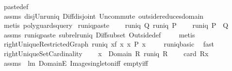 \begin{isabellebody}
\ paste{\isacharunderscore}def\ \isanewline
\ \ \isamarkupfalse%
\ assms\ disj{\isacharunderscore}Un{\isacharunderscore}runiq\ Diff{\isacharunderscore}disjoint\ Un{\isacharunderscore}commute\ outside{\isacharunderscore}reduces{\isacharunderscore}domain\isanewline
\ \ \isamarkupfalse%
\ {\isacharparenleft}metis\ {\isacharparenleft}poly{\isacharunderscore}guards{\isacharunderscore}query{\isacharparenright}{\isacharparenright}%
\endisatagproof
{\isafoldproof}%
%
\isadelimproof
\isanewline
%
\endisadelimproof
\isanewline
{}\isamarkupfalse%
\ runiq{\isacharunderscore}paste{}{\isacharcolon}\ \isanewline
\ \ \ {\isachardoublequoteopen}runiq\ Q{\isachardoublequoteclose}\ {\isachardoublequoteopen}runiq\ P{\isachardoublequoteclose}\ \isanewline
\ \ \ {\isachardoublequoteopen}runiq\ {\isacharparenleft}P\ {\isacharplus}{\isacharasterisk}\ Q{\isacharparenright}{\isachardoublequoteclose}\isanewline
%
\isadelimproof
\ \ %
\endisadelimproof
%
\isatagproof
{}\isamarkupfalse%
\ assms\ runiq{\isacharunderscore}paste{}\ subrel{\isacharunderscore}runiq\ Diff{\isacharunderscore}subset\ Outside{\isacharunderscore}def\ \isanewline
\ \ \isamarkupfalse%
\ {\isacharparenleft}metis{\isacharparenright}%
\endisatagproof
{\isafoldproof}%
%
\isadelimproof
\isanewline
%
\endisadelimproof
\isanewline
\isanewline
{}\isamarkupfalse%
\ rightUniqueRestrictedGraph{\isacharcolon}\ {\isachardoublequoteopen}runiq\ {\isacharbraceleft}{\isacharparenleft}x{\isacharcomma}f\ x{\isacharparenright}{\isacharbar}\ x{\isachardot}\ P\ x{\isacharbraceright}{\isachardoublequoteclose}\ \isanewline
%
\isadelimproof
\ \ %
\endisadelimproof
%
\isatagproof
{}\isamarkupfalse%
\ runiq{\isacharunderscore}basic\ \isamarkupfalse%
\ fast%
\endisatagproof
{\isafoldproof}%
%
\isadelimproof
\isanewline
%
\endisadelimproof
\isanewline
{}\isamarkupfalse%
\ rightUniqueSetCardinality{\isacharcolon}\ \isanewline
\ \ \ {\isachardoublequoteopen}x\ {\isasymin}\ Domain\ R{\isachardoublequoteclose}\ {\isachardoublequoteopen}runiq\ R{\isachardoublequoteclose}\ \isanewline
\ \ \ {\isachardoublequoteopen}card\ {\isacharparenleft}R{\isacharbackquote}{\isacharbackquote}{\isacharbraceleft}x{\isacharbraceright}{\isacharparenright}{\isacharequal}{}{\isachardoublequoteclose}\isanewline
%
\isadelimproof
\ \ %
\endisadelimproof
%
\isatagproof
{}\isamarkupfalse%
\ assms\ \ lm{}{}\ DomainE\ Image{\isacharunderscore}singleton{\isacharunderscore}iff\ empty{\isacharunderscore}iff\isanewline

\end{isabellebody}
